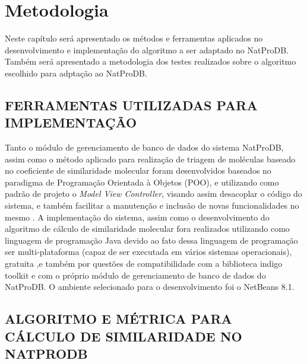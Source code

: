 
\chapter{Metodologia}
\label{chap:metodo}
Neste capítulo será apresentado os métodos e ferramentas aplicados no
desenvolvimento e implementação do algoritmo a ser adaptado no NatProDB. Também será
apresentado a metodologia dos testes realizados sobre o algoritmo escolhido para adptação ao
NatProDB.

\section{FERRAMENTAS UTILIZADAS PARA IMPLEMENTAÇÃO}

Tanto o módulo de gerenciamento de banco de dados do sistema NatProDB, assim como o método aplicado para  realização de triagem de moléculas baseado no coeficiente de similaridade molecular foram desenvolvidos baseados no paradigma de Programação Orientada à Objetos (POO), e utilizando como padrão de projeto o \textit{Model View Controller}, visando assim desacoplar o código do sistema, e também facilitar a manutenção e inclusão de novas funcionalidades no mesmo \cite{patterns2003model}. A implementação do sistema, assim como o desenvolvimento do algoritmo de cálculo de similaridade molecular fora realizados utilizando como linguagem de programação Java devido ao fato dessa linguagem de programação ser multi-plataforma (capaz de ser executada em vários sistemas operacionais),  gratuita ,e também por questões de compatibilidade com a biblioteca indigo toolkit e com o próprio módulo de gerenciamento de banco de dados do NatProDB. O ambiente selecionado para o desenvolvimento foi o NetBeans 8.1.

\section{ALGORITMO E MÉTRICA PARA CÁLCULO DE SIMILARIDADE NO NATPRODB}

